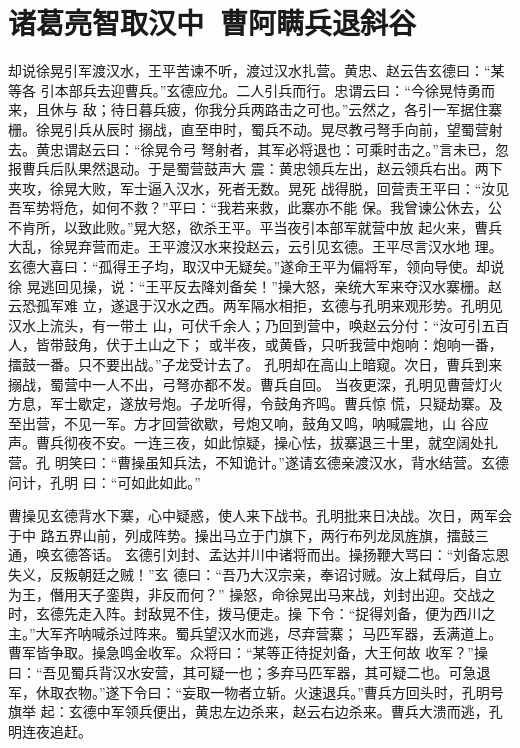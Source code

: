 \chapter{诸葛亮智取汉中~曹阿瞒兵退斜谷}

却说徐晃引军渡汉水，王平苦谏不听，渡过汉水扎营。黄忠、赵云告玄德曰：“某等各
引本部兵去迎曹兵。”玄德应允。二人引兵而行。忠谓云曰：“今徐晃恃勇而来，且休与
敌；待日暮兵疲，你我分兵两路击之可也。”云然之，各引一军据住寨栅。徐晃引兵从辰时
搦战，直至申时，蜀兵不动。晃尽教弓弩手向前，望蜀营射去。黄忠谓赵云曰：“徐晃令弓
弩射者，其军必将退也：可乘时击之。”言未已，忽报曹兵后队果然退动。于是蜀营鼓声大
震：黄忠领兵左出，赵云领兵右出。两下夹攻，徐晃大败，军士逼入汉水，死者无数。晃死
战得脱，回营责王平曰：“汝见吾军势将危，如何不救？”平曰：“我若来救，此寨亦不能
保。我曾谏公休去，公不肯所，以致此败。”晃大怒，欲杀王平。平当夜引本部军就营中放
起火来，曹兵大乱，徐晃弃营而走。王平渡汉水来投赵云，云引见玄德。王平尽言汉水地
理。玄德大喜曰：“孤得王子均，取汉中无疑矣。”遂命王平为偏将军，领向导使。却说徐
晃逃回见操，说：“王平反去降刘备矣！”操大怒，亲统大军来夺汉水寨栅。赵云恐孤军难
立，遂退于汉水之西。两军隔水相拒，玄德与孔明来观形势。孔明见汉水上流头，有一带土
山，可伏千余人；乃回到营中，唤赵云分付：“汝可引五百人，皆带鼓角，伏于土山之下；
或半夜，或黄昏，只听我营中炮响：炮响一番，擂鼓一番。只不要出战。”子龙受计去了。
孔明却在高山上暗窥。次日，曹兵到来搦战，蜀营中一人不出，弓弩亦都不发。曹兵自回。
当夜更深，孔明见曹营灯火方息，军士歇定，遂放号炮。子龙听得，令鼓角齐鸣。曹兵惊
慌，只疑劫寨。及至出营，不见一军。方才回营欲歇，号炮又响，鼓角又鸣，呐喊震地，山
谷应声。曹兵彻夜不安。一连三夜，如此惊疑，操心怯，拔寨退三十里，就空阔处扎营。孔
明笑曰：“曹操虽知兵法，不知诡计。”遂请玄德亲渡汉水，背水结营。玄德问计，孔明
曰：“可如此如此。”

曹操见玄德背水下寨，心中疑惑，使人来下战书。孔明批来日决战。次日，两军会于中
路五界山前，列成阵势。操出马立于门旗下，两行布列龙凤旌旗，擂鼓三通，唤玄德答话。
玄德引刘封、孟达并川中诸将而出。操扬鞭大骂曰：“刘备忘恩失义，反叛朝廷之贼！”玄
德曰：“吾乃大汉宗亲，奉诏讨贼。汝上弑母后，自立为王，僭用天子銮舆，非反而何？”
操怒，命徐晃出马来战，刘封出迎。交战之时，玄德先走入阵。封敌晃不住，拨马便走。操
下令：“捉得刘备，便为西川之主。”大军齐呐喊杀过阵来。蜀兵望汉水而逃，尽弃营寨；
马匹军器，丢满道上。曹军皆争取。操急鸣金收军。众将曰：“某等正待捉刘备，大王何故
收军？”操曰：“吾见蜀兵背汉水安营，其可疑一也；多弃马匹军器，其可疑二也。可急退
军，休取衣物。”遂下令曰：“妄取一物者立斩。火速退兵。”曹兵方回头时，孔明号旗举
起：玄德中军领兵便出，黄忠左边杀来，赵云右边杀来。曹兵大溃而逃，孔明连夜追赶。

